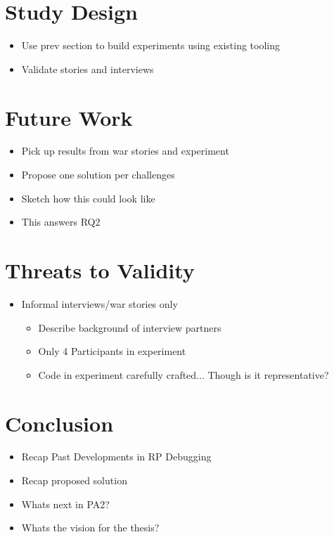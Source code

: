 \documentclass[12pt,a4paper]{article}
\begin{document}
\section{Study Design}
\label{sec:study}

\begin{itemize}
	\item Use prev section to build experiments using existing tooling
	\item Validate stories and interviews
\end{itemize}

\section{Future Work}
\label{sec:future}

\begin{itemize}
	\item Pick up results from war stories and experiment
	\item Propose one solution per challenges
	\item Sketch how this could look like
	\item This answers RQ2
\end{itemize}

\section{Threats to Validity}
\label{sec:threats}

\begin{itemize}
	\item Informal interviews/war stories only
	\begin{itemize}
		\item Describe background of interview partners
		\item Only 4 Participants in experiment
		\item Code in experiment carefully crafted... Though is it representative?
		\
	\end{itemize}
\end{itemize}

\section{Conclusion}
\label{sec:conclusion}

\begin{itemize}
	\item Recap Past Developments in RP Debugging
	\item Recap proposed solution
	\item Whats next in PA2?
	\item Whats the vision for the thesis?
\end{itemize}
\end{document}
